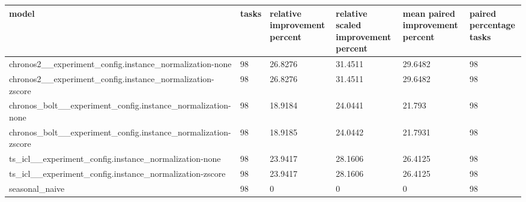 \begin{tabular}{llllll}
\toprule
model & tasks & relative improvement percent & relative scaled improvement percent & mean paired improvement percent & paired percentage tasks \\
\midrule
chronos2\_\_experiment\_config.instance\_normalization-none & 98 & 26.8276 & 31.4511 & 29.6482 & 98 \\
chronos2\_\_experiment\_config.instance\_normalization-zscore & 98 & 26.8276 & 31.4511 & 29.6482 & 98 \\
chronos\_bolt\_\_experiment\_config.instance\_normalization-none & 98 & 18.9184 & 24.0441 & 21.793 & 98 \\
chronos\_bolt\_\_experiment\_config.instance\_normalization-zscore & 98 & 18.9185 & 24.0442 & 21.7931 & 98 \\
ts\_icl\_\_experiment\_config.instance\_normalization-none & 98 & 23.9417 & 28.1606 & 26.4125 & 98 \\
ts\_icl\_\_experiment\_config.instance\_normalization-zscore & 98 & 23.9417 & 28.1606 & 26.4125 & 98 \\
seasonal\_naive & 98 & 0 & 0 & 0 & 98 \\
\bottomrule
\end{tabular}
